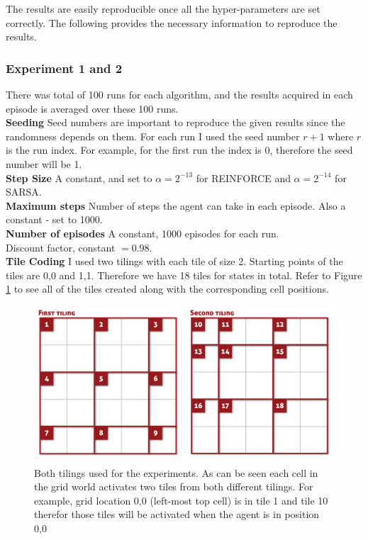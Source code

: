 \documentclass[10pt, letterpaper, twocolumn]{article}
\begin{document}
	\noindent The results are easily reproducible once all the hyper-parameters are set correctly. The following provides the necessary information to reproduce the results.
	
	\subsubsection{Experiment 1 and 2}
	
	\noindent There was total of 100 runs for each algorithm, and the results acquired in each episode is averaged over these 100 runs.\\
	
	\noindent \textbf{Seeding} Seed numbers are important to reproduce the given results since the randomness depends on them. For each run I used the seed number $r+1$ where $r$ is the run index. For example, for the first run the index is 0, therefore the seed number will be 1.\\
	
	\noindent \textbf{Step Size} A constant, and set to $\alpha = 2^{-13}$ for REINFORCE and $\alpha = 2^{-14}$ for SARSA.\\
	
	\noindent \textbf{Maximum steps} Number of steps the agent can take in each episode. Also a constant - set to 1000. \\
	
	\noindent \textbf{Number of episodes} A constant, 1000 episodes for each run. \\
	
	\noindent \bm{$\gamma$} Discount factor, constant  $= 0.98$.\\
	
	\noindent \textbf{Tile Coding} I used two tilings with each tile of size 2. Starting points of the tiles are 0,0 and 1,1. Therefore we have 18 tiles for states in total. Refer to Figure \ref{fig:tile_coding} to see all of the tiles created along with the corresponding cell positions.
	
	\begin{figure}[h]
		\centering
		\includegraphics[width=\linewidth]{tiles}
		\caption{\small Both tilings used for the experiments. As can be seen each cell in the grid world activates two tiles from both different tilings. For example, grid location 0,0 (left-most top cell) is in tile 1 and tile 10 therefor those tiles will be activated when the agent is in position 0,0}
		\label{fig:tile_coding}
	\end{figure}
	
\end{document}

